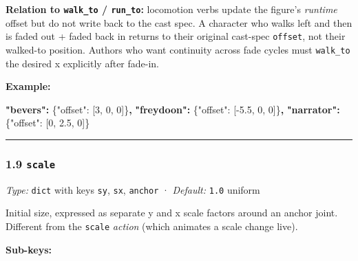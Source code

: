 \documentclass[
  11pt,
]{book}
\newenvironment{Shaded}{}{}
\newcommand{\DataTypeTok}[1]{\textcolor[rgb]{0.56,0.13,0.00}{#1}}
\newcommand{\DecValTok}[1]{\textcolor[rgb]{0.25,0.63,0.44}{#1}}
\newcommand{\ErrorTok}[1]{\textcolor[rgb]{1.00,0.00,0.00}{\textbf{#1}}}
\newcommand{\FloatTok}[1]{\textcolor[rgb]{0.25,0.63,0.44}{#1}}
\newcommand{\FunctionTok}[1]{\textcolor[rgb]{0.02,0.16,0.49}{#1}}
\newcommand{\OtherTok}[1]{\textcolor[rgb]{0.00,0.44,0.13}{#1}}
\begin{document}
\textbf{Relation to \texttt{walk\_to} / \texttt{run\_to}:} locomotion
verbs update the figure's \emph{runtime} offset but do not write back to
the cast spec. A character who walks left and then is faded out + faded
back in returns to their original cast-spec \texttt{offset}, not their
walked-to position. Authors who want continuity across fade cycles must
\texttt{walk\_to} the desired x explicitly after fade-in.

\textbf{Example:}

\begin{Shaded}
\begin{Highlighting}[]
\ErrorTok{"bevers":}  \FunctionTok{\{}\DataTypeTok{"offset"}\FunctionTok{:} \OtherTok{[}\DecValTok{3}\OtherTok{,} \DecValTok{0}\OtherTok{,} \DecValTok{0}\OtherTok{]}\FunctionTok{\}}\ErrorTok{,}
\ErrorTok{"freydoon":} \FunctionTok{\{}\DataTypeTok{"offset"}\FunctionTok{:} \OtherTok{[}\FloatTok{{-}5.5}\OtherTok{,} \DecValTok{0}\OtherTok{,} \DecValTok{0}\OtherTok{]}\FunctionTok{\}}\ErrorTok{,}
\ErrorTok{"narrator":} \FunctionTok{\{}\DataTypeTok{"offset"}\FunctionTok{:} \OtherTok{[}\DecValTok{0}\OtherTok{,} \FloatTok{2.5}\OtherTok{,} \DecValTok{0}\OtherTok{]}\FunctionTok{\}}
\end{Highlighting}
\end{Shaded}

\begin{center}\rule{0.5\linewidth}{0.5pt}\end{center}

\subsubsection{\texorpdfstring{1.9
\texttt{scale}}{1.9 scale}}\label{scale}

\emph{Type:} \texttt{dict} with keys \texttt{sy}, \texttt{sx},
\texttt{anchor} · \emph{Default:} \texttt{1.0} uniform

Initial size, expressed as separate y and x scale factors around an
anchor joint. Different from the \texttt{scale} \emph{action} (which
animates a scale change live).

\textbf{Sub-keys:}
\end{document}
